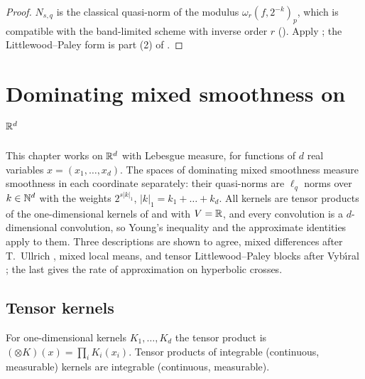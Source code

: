 \begin{proof}
\leanok
$N_{s, q}$ is the classical quasi-norm of the modulus $\omega_r(f, 2^{-k})_p$, which is
compatible with the band-limited scheme with inverse order $r$ (). Apply
; the Littlewood--Paley form is part (2) of
.
\end{proof}



\chapter{Dominating mixed smoothness on \texorpdfstring{$\mathbb{R}^d$}{R\^{}d}}
\label{ch:mixed-smoothness}

This chapter works on $\mathbb{R}^d$ with Lebesgue measure, for functions of $d$ real variables
$x = (x_1, \dots, x_d)$. The spaces of dominating mixed smoothness measure smoothness in each
coordinate separately: their quasi-norms are $\ell_q$ norms over $k \in \mathbb{N}^d$ with the weights
$2^{s|k|_1}$, $|k|_1 = k_1 + \dots + k_d$. All kernels are tensor products of the one-dimensional
kernels of  and  with $V = \mathbb{R}$, and every convolution is a
$d$-dimensional convolution, so Young's inequality and the approximate identities apply to
them. Three
descriptions are shown to agree, mixed differences after T.~Ullrich \cite{UllrichT}, mixed local
means, and tensor Littlewood--Paley blocks after Vyb\'{\i}ral \cite{Vybiral}; the last gives the
rate of approximation on hyperbolic crosses.

\section{Tensor kernels}

\begin{definition}
\label{def:tensor-kernel}
\leanok
For one-dimensional kernels $K_1, \dots, K_d$ the tensor product is
$(\otimes K)(x) = \prod_i K_i(x_i)$. Tensor products of integrable (continuous, measurable)
kernels are integrable (continuous, measurable).
\end{definition}

